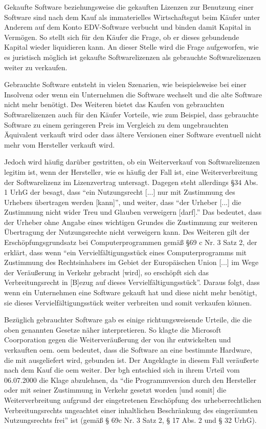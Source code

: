 Gekaufte Software beziehungsweise die gekauften Lizenzen zur Benutzung einer Software sind nach dem Kauf als immaterielles Wirtschaftsgut beim Käufer unter Anderem
auf dem Konto EDV-Software verbucht und binden damit Kapital in Vermögen. So stellt sich für den Käufer die Frage, ob er dieses gebundende Kapital wieder liquidieren kann.
An dieser Stelle wird die Frage aufgeworfen, wie es juristisch möglich ist gekaufte Softwarelizenzen als gebrauchte Softwarelizenzen weiter zu verkaufen. 

Gebrauchte Software entsteht in vielen Szenarien, wie beispielsweise bei einer Insolvenz oder wenn ein Unternehmen die Software wechselt und die alte Software nicht mehr benötigt.
Des Weiteren bietet das Kaufen von gebrauchten Softwarelizenzen auch für den Käufer Vorteile, wie zum Beispiel, dass gebrauchte Software zu einem geringeren Preis im Vergleich
zu dem ungebrauchten Äquivalent verkauft wird oder dass ältere Versionen einer Software eventuell nicht mehr vom Hersteller verkauft wird. 

Jedoch wird häufig darüber gestritten, ob ein Weiterverkauf von Softwarelizenzen legitim ist, wenn der Hersteller, wie es häufig der Fall ist, eine Weiterverbreitung der
Softwarelizenz im Lizenzvertrag untersagt. Dagegen steht allerdings §34 Abs. 1 UrhG der besagt, dass “ein Nutzungsrecht [...] nur mit Zustimmung des Urhebers übertragen werden [kann]”,
und weiter, dass “der Urheber [...] die Zustimmung nicht wider Treu und Glauben verweigern [darf].” Das bedeutet, dass der Urheber ohne Angabe eines wichtigen
Grundes die Zustimmung zur weiteren Übertragung der Nutzungsrechte nicht verweigern kann. Des Weiteren gilt der Erschöpfungsgrundsatz bei Computerprogrammen gemäß §69 c Nr. 3 Satz 2,
der erklärt, dass wenn “ein Vervielfältigungsstück eines Computerprogramms mit Zustimmung des Rechtsinhabers im Gebiet der Europäischen Union [...] im Wege der Veräußerung in Verkehr
gebracht [wird], so erschöpft sich das Verbreitungsrecht in [B]ezug auf dieses Vervielfältigungsstück”. Daraus folgt, dass wenn ein Unternehmen eine Software gekauft hat und diese
nicht mehr benötigt, sie dieses Vervielfältigungsstück weiter verbreiten und somit verkaufen können. 

Bezüglich gebrauchter Software gab es einige richtungsweisende Urteile, die die oben genannten Gesetze näher interpretieren. So klagte die Microsoft Coorporation
gegen die Weiterveräußerung der von ihr entwickelten und verkauften \gls{oem}. \gls{oem} bedeutet,
dass die Software an eine bestimmte Hardware, die mit ausgeliefert wird, gebunden ist. Der Angeklagte in diesem Fall veräußerte nach dem Kauf die \gls{oem} weiter.
Der \gls{bgh} entschied sich in ihrem Urteil vom 06.07.2000 die Klage abzulehnen, da “die Programmversion durch den Hersteller oder mit seiner Zustimmung in Verkehr gesetzt worden
[und somit] die Weiterverbreitung aufgrund der eingetretenen Erschöpfung des urheberrechtlichen Verbreitungsrechts ungeachtet einer inhaltlichen Beschränkung des eingeräumten
Nutzungsrechts frei” ist (gemäß § 69c Nr. 3 Satz 2, § 17 Abs. 2 und § 32 UrhG).

